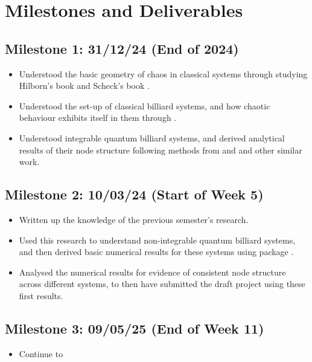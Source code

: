 \documentclass[12pt,a4paper]{amsart}
\begin{document}
\section{Milestones and Deliverables}


\subsection*{Milestone 1: 31/12/24 (End of 2024)}
\begin{itemize}
    \item Understood the basic geometry of chaos in classical systems through studying Hilborn's book \cite{HILBORN} and Scheck's book \cite{SCHECK}.
    \item Understood the set-up of classical billiard systems, and how chaotic behaviour exhibits itself in them through \cite{KORSCH}.
    \item Understood integrable quantum billiard systems, and derived analytical results of their node structure following methods from \cite{ARND} and \cite{CASATI} and other similar work.
\end{itemize}
\subsection*{Milestone 2: 10/03/24 (Start of Week 5)}
\begin{itemize}
    \item Written up the knowledge of the previous semester's research.
    \item Used this research to understand non-integrable quantum billiard systems, and then derived basic numerical results for these systems using package \cite{CODE}.
    \item Analysed the numerical results for evidence of consistent node structure across different systems, to then have submitted the draft project using these first results.
\end{itemize}
\subsection*{Milestone 3: 09/05/25 (End of Week 11)}
\begin{itemize}
    \item Continue to 
\end{itemize}
\end{document}
